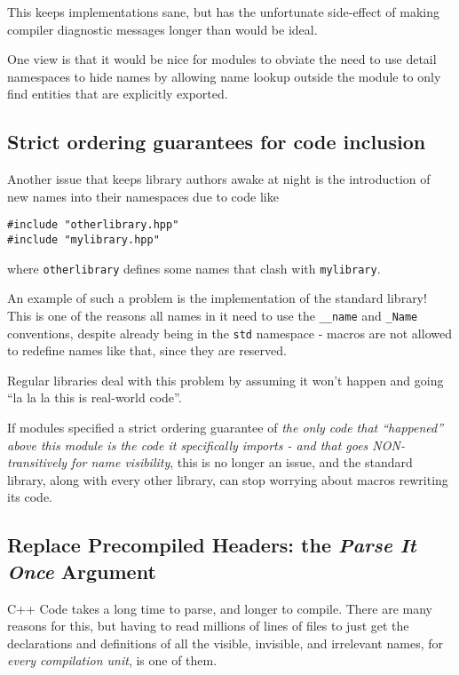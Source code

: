 \documentclass[reqno]{article}
\begin{document}
This keeps implementations sane, but has the unfortunate side-effect of making
compiler diagnostic messages longer than would be ideal.

One view is that it would be nice for modules to obviate the need to use detail
namespaces to hide names by allowing name lookup outside the module to only
find entities that are explicitly exported.


\subsection{Strict ordering guarantees for code inclusion}

Another issue that keeps library authors awake at night is the introduction of
new names into their namespaces due to code like

\begin{verbatim}
#include "otherlibrary.hpp"
#include "mylibrary.hpp"
\end{verbatim}

where \texttt{otherlibrary} defines some names that clash with
\texttt{mylibrary}.

An example of such a problem is the implementation of the standard library! This
is one of the reasons all names in it need to use the \texttt{\_\_name} and
\texttt{\_Name} conventions, despite already being in the \texttt{std} namespace
- macros are not allowed to redefine names like that, since they are reserved.

Regular libraries deal with this problem by assuming it won't happen and going
“la la la this is real-world code”.

If modules specified a strict ordering guarantee of \emph{the only code that
“happened” above this module is the code it specifically imports - and that goes
NON-transitively for name visibility}, this is no longer an issue, and the
standard library, along with every other library, can stop worrying about macros
rewriting its code.


\subsection{Replace Precompiled Headers: the \emph{Parse It Once} Argument}

C++ Code takes a long time to parse, and longer to compile. There are many
reasons for this, but having to read millions of lines of files to just get the
declarations and definitions of all the visible, invisible, and irrelevant
names, for \emph{every compilation unit}, is one of them.
\end{document}
